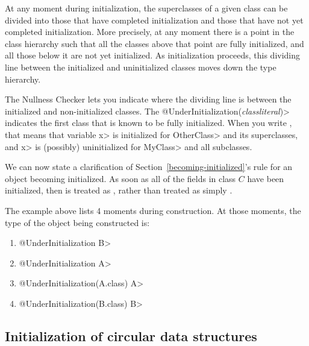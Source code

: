 At any moment during initialization, the superclasses of a given class
can be divided into those that have completed initialization and those that
have not yet completed initialization.  More precisely, at any moment there
is a point in the class hierarchy such that all the classes above that
point are fully initialized, and all those below it are not yet
initialized.  As initialization proceeds, this dividing line between the
initialized and uninitialized classes moves down the type hierarchy.

The Nullness Checker lets you indicate where the dividing line is between
the initialized and non-initialized classes.
The \<@UnderInitialization(\emph{classliteral})>
indicates the first class that is known to be fully initialized.
When you write , that
means that variable \<x> is initialized for \<OtherClass> and its
superclasses, and \<x> is (possibly) uninitialized for \<MyClass> and all subclasses.

\label{becoming-initialized-clarification}

We can now state a clarification of Section~\ref{becoming-initialized}'s rule
for an object becoming initialized.
As soon as all of the  fields
in class $C$ have been initialized, then  is treated as
, rather than
treated as simply
.

The example above lists 4 moments during construction.  At those moments,
the type of the object being constructed is:

\begin{enumerate}
\item
  \<@UnderInitialization B>
\item
  \<@UnderInitialization A>
\item
  \<@UnderInitialization(A.class) A>
\item
  \<@UnderInitialization(B.class) B>
\end{enumerate}


\subsection{Initialization of circular data structures\label{circular-initialization}}

